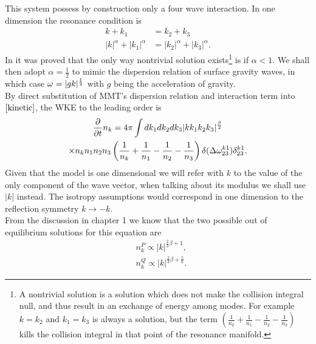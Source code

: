     This system possess by construction only a four wave interaction. In one dimension the resonance condition is
    \begin{equation}
        \begin{aligned}
            k + k_1 &= k_2 + k_3 \\
            |k|^\alpha + |k_1|^\alpha &= |k_2|^\alpha + |k_3|^\alpha.
        \end{aligned}
    \end{equation}
    In \cite{Majda1997} it was proved that the only way nontrivial solution exists\footnote{
        A nontrivial solution is a solution which does not make the collision integral null, and thus result in an exchange of energy among modes. 
        For example $k=k_2$ and $k_1=k_3$ is always a solution, but the term 
        $\left(\frac{1}{n_k} +\frac{1}{n_1} -\frac{1}{n_2}-\frac{1}{n_3} \right)$ kills the collision integral in that point of the resonance manifold.
    } is if $\alpha < 1$. We shall then adopt $\alpha = \frac{1}{2}$ to mimic the dispersion relation of surface gravity waves, in which case $\omega^{} = |gk|^\frac{1}{2}$ 
    with $g$ being the acceleration of gravity.\\
    By direct substitution of MMT's dispersion relation and interaction term into $\eqref{kinetic}$, the WKE to the leading order is 
    \begin{multline}
        \frac{\partial}{\partial t} n_k = 4 \pi\int dk_1 dk_2 dk_3 
        |kk_1k_2k_3|^\frac{\beta}{2}
        \\ \times n_kn_1n_2n_3
    \left(\frac{1}{n_k} + \frac{1}{n_1} - \frac{1}{n_2}- \frac{1}{n_3}  \right)
    \delta(\Delta{\omega}^{k1}_{23})\delta^{k1}_{23}.
    \end{multline}
    Given that the model is one dimensional we will refer with $k$ to the value of the only component of the wave vector, when talking about its modulus we shall use $|k|$ instead. The isotropy assumptions would correspond in one dimension
    to the reflection symmetry $k \rightarrow -k$.\\ 
    From the discussion in chapter 1 we know that the two possible out of equilibrium solutions for this equation are 
    \begin{equation}
        \begin{aligned}
        &n_k^P \propto |k|^{\frac{2}{3}\beta + 1}, \\
        &n_k^Q \propto |k|^{\frac{2}{3}\beta + \frac{5}{6}}.
        \end{aligned}
        \label{MMTKZ}
    \end{equation}
